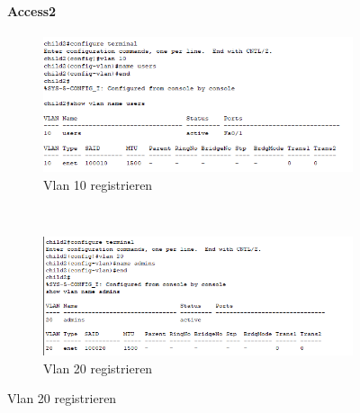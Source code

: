 \begin{figure}[!htb]
    \paragraph{Access2}
    \centering
    \begin{subfigure}{\textwidth}
        \includegraphics[width=\textwidth]{./img/Access2/vlan10.png}
        \caption{Vlan 10 registrieren}
    \end{subfigure}
    ~
    \begin{subfigure}{\textwidth}
        \includegraphics[width=\textwidth]{./img/Access2/vlan20.png}
        \caption{Vlan 20 registrieren}
    \end{subfigure}
\end{figure}
